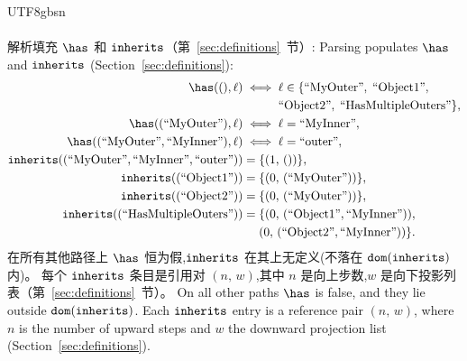 \begin{CJK*}{UTF8}{gbsn}
\paragraph{}
\ifPaperChinese
解析填充 $\has$ 和 $\mathtt{inherits}$（第~\ref{sec:definitions}~节）:
\else
Parsing populates $\has$ and $\mathtt{inherits}$
(Section~\ref{sec:definitions}):
\fi
\begin{align*}
  \has((), \ell) &\iff \ell \in \{
    \text{``MyOuter''},\;
    \text{``Object1''}, \\
    &\hphantom{{}\iff{}}
    \text{``Object2''},\;
  \text{``HasMultipleOuters''}\}, \\
  \has((\text{``MyOuter''}), \ell) &\iff \ell = \text{``MyInner''}, \\
  \has((\text{``MyOuter''}, \text{``MyInner''}), \ell) &\iff \ell = \text{``outer''}, \\
  \inherits((\text{``MyOuter''}, \text{``MyInner''}, \text{``outer''})) &=
  \{(1,\, ())\}, \\
  \inherits((\text{``Object1''})) &= \{(0,\, (\text{``MyOuter''}))\}, \\
  \inherits((\text{``Object2''})) &= \{(0,\, (\text{``MyOuter''}))\}, \\
  \inherits((\text{``HasMultipleOuters''})) &=
  \{(0,\, (\text{``Object1''}, \text{``MyInner''})), \\
  &\hphantom{{}={}}
  (0,\, (\text{``Object2''}, \text{``MyInner''}))\}.
\end{align*}
\ifPaperChinese
在所有其他路径上 $\has$ 恒为假,$\mathtt{inherits}$ 在其上无定义(不落在 $\mathtt{dom}(\mathtt{inherits})$ 内)。
每个 $\mathtt{inherits}$ 条目是引用对 $(n,\, w)$,其中 $n$ 是向上步数,$w$ 是向下投影列表（第~\ref{sec:definitions}~节）。
\else
On all other paths $\has$ is false, and they lie outside $\mathtt{dom}(\mathtt{inherits})$.
Each $\mathtt{inherits}$ entry is a reference pair $(n,\, w)$,
where $n$ is the number of upward steps and $w$ the
downward projection list (Section~\ref{sec:definitions}).
\fi


\end{CJK*}
